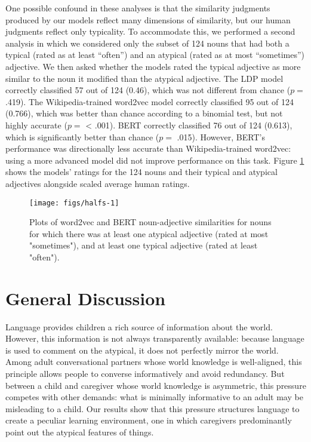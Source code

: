 \documentclass{ucetd}
\begin{document}
One possible confound in these analyses is that the similarity judgments
produced by our models reflect many dimensions of similarity, but our
human judgments reflect only typicality. To accommodate this, we
performed a second analysis in which we considered only the subset of
124 nouns that had both a typical (rated as at least ``often'') and an
atypical (rated as at most ``sometimes'') adjective. We then asked
whether the models rated the typical adjective as more similar to the
noun it modified than the atypical adjective. The LDP model correctly
classified 57 out of 124 (0.46), which was not different from chance
(\(p =\) .419). The Wikipedia-trained word2vec model correctly
classified 95 out of 124 (0.766), which was better than chance according
to a binomial test, but not highly accurate (\(p =\) \textless{} .001).
BERT correctly classified 76 out of 124 (0.613), which is significantly
better than chance (\(p =\) .015). However, BERT's performance was
directionally less accurate than Wikipedia-trained word2vec: using a
more advanced model did not improve performance on this task. Figure
\ref{fig:halfs} shows the models' ratings for the 124 nouns and their
typical and atypical adjectives alongside scaled average human ratings.

\begin{figure}[!tb]

{\centering \texttt{[image: figs/halfs-1]} 

}

\caption{Plots of word2vec and BERT noun-adjective similarities for nouns for which there was at least one atypical adjective (rated at most "sometimes"), and at least one typical adjective (rated at least "often").}\label{fig:halfs}
\end{figure}

\hypertarget{general-discussion}{%
\section{General Discussion}\label{general-discussion}}

Language provides children a rich source of information about the world.
However, this information is not always transparently available: because
language is used to comment on the atypical, it does not perfectly
mirror the world. Among adult conversational partners whose world
knowledge is well-aligned, this principle allows people to converse
informatively and avoid redundancy. But between a child and caregiver
whose world knowledge is asymmetric, this pressure competes with other
demands: what is minimally informative to an adult may be misleading to
a child. Our results show that this pressure structures language to
create a peculiar learning environment, one in which caregivers
predominantly point out the atypical features of things.
\end{document}
